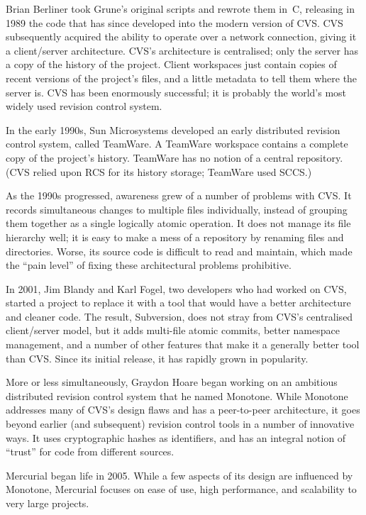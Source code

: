 Brian Berliner took Grune's original scripts and rewrote them in~C,
releasing in 1989 the code that has since developed into the modern
version of CVS.  CVS subsequently acquired the ability to operate over
a network connection, giving it a client/server architecture.  CVS's
architecture is centralised; only the server has a copy of the history
of the project.  Client workspaces just contain copies of recent
versions of the project's files, and a little metadata to tell them
where the server is.  CVS has been enormously successful; it is
probably the world's most widely used revision control system.

In the early 1990s, Sun Microsystems developed an early distributed
revision control system, called TeamWare.  A TeamWare workspace
contains a complete copy of the project's history.  TeamWare has no
notion of a central repository.  (CVS relied upon RCS for its history
storage; TeamWare used SCCS.)

As the 1990s progressed, awareness grew of a number of problems with
CVS.  It records simultaneous changes to multiple files individually,
instead of grouping them together as a single logically atomic
operation.  It does not manage its file hierarchy well; it is easy to
make a mess of a repository by renaming files and directories.  Worse,
its source code is difficult to read and maintain, which made the
``pain level'' of fixing these architectural problems prohibitive.

In 2001, Jim Blandy and Karl Fogel, two developers who had worked on
CVS, started a project to replace it with a tool that would have a
better architecture and cleaner code.  The result, Subversion, does
not stray from CVS's centralised client/server model, but it adds
multi-file atomic commits, better namespace management, and a number
of other features that make it a generally better tool than CVS.
Since its initial release, it has rapidly grown in popularity.

More or less simultaneously, Graydon Hoare began working on an
ambitious distributed revision control system that he named Monotone.
While Monotone addresses many of CVS's design flaws and has a
peer-to-peer architecture, it goes beyond earlier (and subsequent)
revision control tools in a number of innovative ways.  It uses
cryptographic hashes as identifiers, and has an integral notion of
``trust'' for code from different sources.

Mercurial began life in 2005.  While a few aspects of its design are
influenced by Monotone, Mercurial focuses on ease of use, high
performance, and scalability to very large projects.

